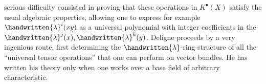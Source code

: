 {} serious difficulty consisted in proving that these operations in $K^\bullet(X)$ satisfy the usual algebraic properties, allowing one to express for example $\handwritten{\lambda}^i(xy)$ as a universal polynomial with integer coefficients in the $\handwritten{\lambda}^j(x),\handwritten{\lambda}^k(y)$. Deligne proceeds by a very ingenious route, first determining the $\handwritten{\lambda}$-ring structure of all the ``universal tensor operations'' that one can perform on vector bundles. He has written his theory only when one works over a base field \handwritten{(}of arbitrary characteristic\handwritten{)}. 
